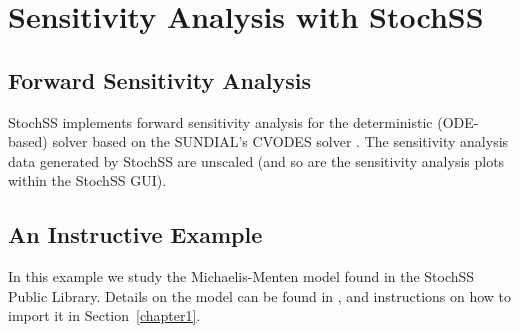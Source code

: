 \chapter{Sensitivity Analysis with StochSS}

%

\section{Forward Sensitivity Analysis}
StochSS implements forward sensitivity analysis for the deterministic (ODE-based) solver based on the SUNDIAL's CVODES solver \cite{sundials}. The sensitivity analysis data generated by StochSS are unscaled (and so are the sensitivity analysis plots within the StochSS GUI).

\section{An Instructive Example}

In this example we study the Michaelis-Menten model found in the StochSS Public Library. Details on the model can be found in \cite{wiki-michaelis-menten}, and instructions on how to import it in Section~\ref{chapter1}. 

